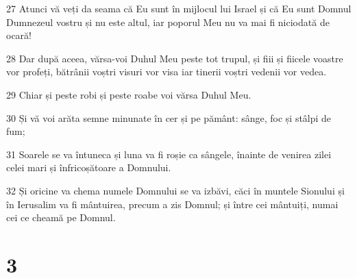 \par 27 Atunci vă veți da seama că Eu sunt în mijlocul lui Israel și că Eu sunt Domnul Dumnezeul vostru și nu este altul, iar poporul Meu nu va mai fi niciodată de ocară!
\par 28 Dar după aceea, vărsa-voi Duhul Meu peste tot trupul, și fiii și fiicele voastre vor profeți, bătrânii voștri visuri vor visa iar tinerii voștri vedenii vor vedea.
\par 29 Chiar și peste robi și peste roabe voi vărsa Duhul Meu.
\par 30 Și vă voi arăta semne minunate în cer și pe pământ: sânge, foc și stâlpi de fum;
\par 31 Soarele se va întuneca și luna va fi roșie ca sângele, înainte de venirea zilei celei mari și înfricoșătoare a Domnului.
\par 32 Și oricine va chema numele Domnului se va izbăvi, căci în muntele Sionului și în Ierusalim va fi mântuirea, precum a zis Domnul; și între cei mântuiți, numai cei ce cheamă pe Domnul.

\chapter{3}

